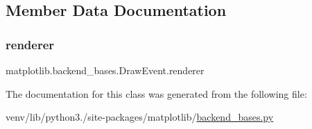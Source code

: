 \subsection{Member Data Documentation}
\mbox{\label{classmatplotlib_1_1backend__bases_1_1DrawEvent_ae702afe085dcd8aa2fbd6b1ac80a10d3}} 
\subsubsection{\texorpdfstring{renderer}{renderer}}
{\footnotesize\ttfamily matplotlib.\+backend\+\_\+bases.\+Draw\+Event.\+renderer}



The documentation for this class was generated from the following file\+:\begin{DoxyCompactItemize}
\item 
venv/lib/python3./site-\/packages/matplotlib/\hyperlink{backend__bases_8py}{backend\+\_\+bases.\+py}\end{DoxyCompactItemize}
